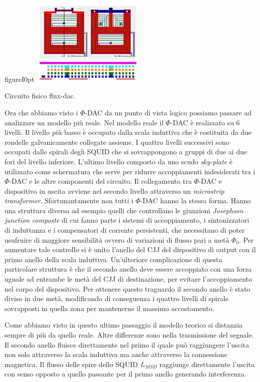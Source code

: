 \begin{wrapfloat}{figure}{I}{0pt}
\includegraphics[width=0.4\textwidth]{Immagini/fluxdac-fisico.jpg}
\caption{Circuito fisico flux-dac.}
\label{figura:fluxdac-fisico}
\end{wrapfloat}
\cite{ACI}Ora che abbiamo visto i $\Phi$-DAC da un punto di vista logico possiamo passare ad analizzare un modello più reale. Nel modello reale il $\Phi$-DAC è realizzato su 6 livelli. Il livello più basso è occupato dalla scala induttiva che è costituita da due rondelle galvanicamente collegate assieme. I quattro livelli successivi sono occupati dalle spirali degli SQUID che si sovrappongono a gruppi di due ai due fori del livello inferiore. L'ultimo livello composto da uno scudo \textit{sky-plate} è utilizzato come schermatura che serve per ridurre accoppiamenti indesiderati tra i $\Phi$-DAC e le altre componenti del circuito. Il collegamento tra $\Phi$-DAC e dispositivo in uscita avviene nel secondo livello attraverso un \textit{microstrip transformer}. Sfortunantamente non tutti i $\Phi$-DAC hanno la stessa forma. Hanno una struttura diversa ad esempio quelli che controllano le giunzioni \textit{Josephson junction composte}  di cui fanno parte i sistemi di accoppiamento, i sintonizzatori di induttanza e i compensatori di corrente persistenti, che necessitano di poter usufruire di maggiore sensibilità ovvero di variazioni di flusso pari a metà $\Phi_0$. Per aumentare tale controllo si è unito l'anello del CJJ del dispositivo di output con il primo anello della scala induttiva. Un'ulteriore complicazione di questa particolare struttura è che il secondo anello deve essere accoppiato con una forza uguale ad entrambe le metà del CJJ di destinazione, per evitare l'accoppiamento nel corpo del dispositivo. Per ottenere questo traguardo il secondo anello è stato diviso in due metà, modificando di conseguenza i quattro livelli di spirale sovrapposti in quella zona per mantenerne il massimo accostamento.

Come abbiamo visto in questo ultimo passaggio il modello teorico si distanzia sempre di più da quello reale. Altre differenze sono nella trasmissione del segnale. Il secondo anello fluisce direttamente nel primo il quale può raggiungere l'uscita non solo attraverso la scala induttiva ma anche attraverso la connessione magnetica. Il flusso delle spire dello SQUID $L_{MSD}$ raggiunge direttamente l'uscita con senso opposto a quello passante per il primo anello generando interferenza.

